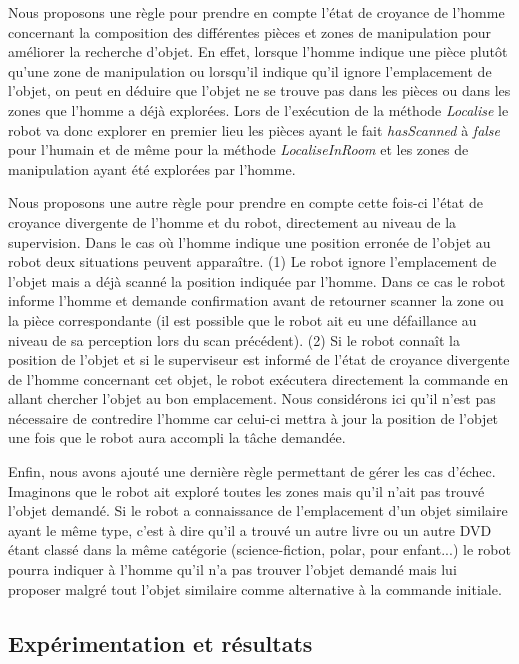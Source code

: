 \documentclass[a4paper,11pt,twoside]{StyleThese}
\begin{document}
Nous proposons une règle pour prendre en compte l'état de croyance de l'homme concernant la composition des différentes pièces et zones de manipulation pour améliorer la recherche d'objet.
En effet, lorsque l'homme indique une pièce plutôt qu'une zone de manipulation ou lorsqu'il indique qu'il ignore l'emplacement de l'objet, on peut en déduire que l'objet ne se trouve pas dans les pièces ou dans les zones que l'homme a déjà explorées. Lors de l'exécution de la méthode \textit{Localise} le robot va donc explorer en premier lieu les pièces ayant le fait \textit{hasScanned} à \textit{false} pour l'humain et de même pour la méthode \textit{LocaliseInRoom} et les zones de manipulation ayant été explorées par l'homme.


Nous proposons une autre règle pour prendre en compte cette fois-ci l'état de croyance divergente de l'homme et du robot, directement au niveau de la supervision.
Dans le cas où l'homme indique une position erronée de l'objet au robot deux situations peuvent apparaître. (1) Le robot ignore l'emplacement de l'objet mais a déjà scanné la position indiquée par l'homme. Dans ce cas le robot informe l'homme et demande confirmation avant de retourner scanner la zone ou la pièce correspondante (il est possible que le robot ait eu une défaillance au niveau de sa perception lors du scan précédent). (2) Si le robot connaît la position de l'objet et si le superviseur est informé de l'état de croyance divergente de l'homme concernant cet objet, le robot exécutera directement la commande en allant chercher l'objet au bon emplacement. Nous considérons ici qu'il n'est pas nécessaire de contredire l'homme car celui-ci mettra à jour la position de l'objet une fois que le robot aura accompli la tâche demandée.


Enfin, nous avons ajouté une dernière règle permettant de gérer les cas d'échec.
Imaginons que le robot ait exploré toutes les zones mais qu'il n'ait pas trouvé l'objet demandé. Si le robot a connaissance de l'emplacement d'un objet similaire ayant le même type, c'est à dire qu'il a trouvé un autre livre ou un autre DVD étant classé dans la même catégorie (science-fiction, polar, pour enfant...) le robot pourra indiquer à l'homme qu'il n'a pas trouver l'objet demandé mais lui proposer malgré tout l'objet similaire comme alternative à la commande initiale.




\subsection{Expérimentation et résultats}
\end{document}
